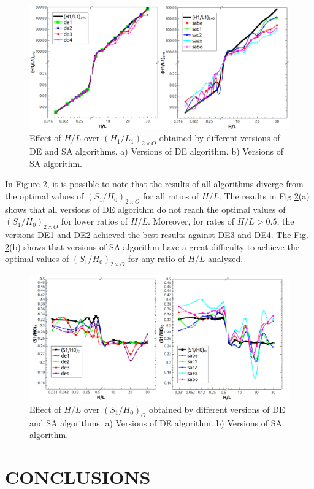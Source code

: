 \documentclass[12pt,fleqn]{article}
\begin{document}
\begin{figure}[H]
\centering
\includegraphics[width=0.9\linewidth]{imgs/5dof/de_sa_hl_h1l1.png}
\caption{ {\small Effect of $H/L$ over ${(H_{1}/L_{1})_{2\times O}}$ obtained by different versions of DE and SA algorithms.  a) Versions of DE algorithm. b) Versions of SA algorithm.}}
\label{figure07}
\end{figure}
In Figure \ref{figure08}, it is possible to note that the results of all algorithms diverge from the optimal values of ${(S_{1}/H_{0})_{2\times O}}$ for all ratios of $H/L$. The results in Fig \ref{figure08}(a) shows that all versions of DE algorithm do not reach the optimal values of ${(S_{1}/H_{0})_{2\times O}}$ for lower ratios of  $H/L$. Moreover, for rates of  $H/L > 0.5$, the versions DE1 and DE2 achieved the best results against DE3 and DE4. The Fig. \ref{figure08}(b) shows that versions of SA algorithm have a great difficulty to achieve the optimal values of ${(S_{1}/H_{0})_{2\times O}}$ for any ratio of  $H/L$ analyzed.
\begin{figure}[H]
\centering
\includegraphics[width=0.9\linewidth]{imgs/5dof/de_sa_hl_s1h0.png}
\caption{ {\small Effect of $H/L$ over ${(S_{1}/H_{0})_{O}}$ obtained by different versions of DE and SA algorithms.  a) Versions of DE algorithm. b) Versions of SA algorithm.}}
\label{figure08}
\end{figure}

\section{CONCLUSIONS}
\end{document}
